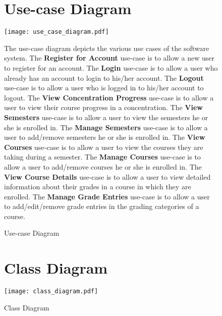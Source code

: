 \documentclass[12pt]{article}
\begin{document}


\begin{figure}[p!]
  \section{Use-case Diagram}
  \centering
  \texttt{[image: use\_case\_diagram.pdf]}
  \caption{Use-case Diagram}
  \newcommand{\usecaseall}{use-case is to allow }
  \begin{flushleft}
    The use-case diagram depicts the various use cases of the software system. The \textbf{Register
    for Account} \usecaseall a new user to register for an account. The \textbf{Login} \usecaseall a
    user who already has an account to login to his/her account. The \textbf{Logout} \usecaseall a
    user who is logged in to his/her account to logout. The \textbf{View Concentration Progress}
    \usecaseall a user to view their course progress in a concentration. The \textbf{View Semesters}
    \usecaseall a user to view the semesters he or she is enrolled in. The \textbf{Manage Semesters}
    \usecaseall a user to add/remove semesters he or she is enrolled in. The \textbf{View Courses}
    \usecaseall a user to view the courses they are taking during a semester. The \textbf{Manage
    Courses} \usecaseall a user to add/remove courses he or she is enrolled in. The \textbf{View
    Course Details} \usecaseall a user to view detailed information about their grades in a course
    in which they are enrolled. The \textbf{Manage Grade Entries} \usecaseall a user to
    add/edit/remove grade entries in the grading categories of a course.
  \end{flushleft}
\end{figure}

\clearpage

\begin{figure}[p!]
  \section{Class Diagram}
  \centering
  \texttt{[image: class\_diagram.pdf]}
  \caption{Class Diagram}
\end{figure}
\end{document}
